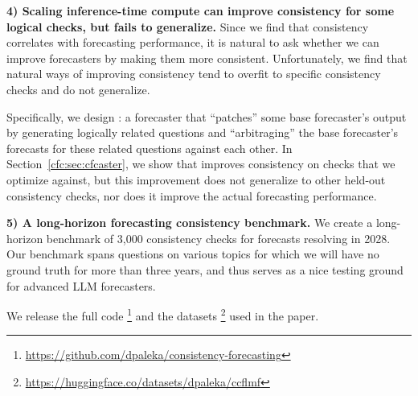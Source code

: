 \textbf{4) Scaling inference-time compute can improve consistency for some logical checks, but fails to generalize.}
Since we find that consistency correlates with forecasting performance, it is natural to ask whether we can improve forecasters by making them more consistent. Unfortunately, we find that natural ways of improving consistency tend to overfit to specific consistency checks and do not generalize.

Specifically, we design \CFCaster{}: a forecaster that ``patches'' some base forecaster's output by generating logically related questions and ``arbitraging'' the base forecaster's forecasts for these related questions against each other.
In Section~\ref{cfc:sec:cfcaster}, we show that \CFCaster{} improves consistency on checks that we optimize against, but this improvement does not generalize to other held-out consistency checks, nor does it improve the actual forecasting performance.

\textbf{5) A long-horizon forecasting consistency benchmark.}
We create a long-horizon benchmark of 3,000 consistency checks for forecasts resolving in 2028. Our benchmark spans questions on various topics for which we will have no ground truth for more than three years, and thus serves as a nice testing ground for advanced LLM forecasters.


We release the full code \footnote{\url{https://github.com/dpaleka/consistency-forecasting}} and the datasets \footnote{\url{https://huggingface.co/datasets/dpaleka/ccflmf}} used in the paper.

